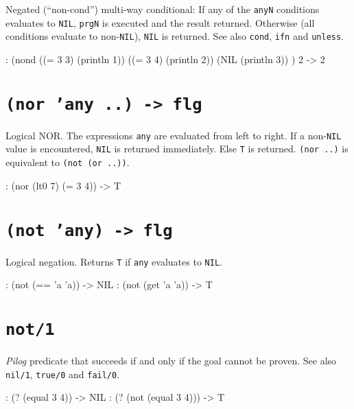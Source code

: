 Negated (``non-cond'') multi-way conditional: If any of the \texttt{anyN}
conditions evaluates to \texttt{NIL}, \texttt{prgN} is executed and the result
returned. Otherwise (all conditions evaluate to non-\texttt{NIL}), \texttt{NIL} is
returned. See also \texttt{cond}, \texttt{ifn} and \texttt{unless}.


\begin{wideverbatim}
: (nond
   ((= 3 3) (println 1))
   ((= 3 4) (println 2))
   (NIL (println 3)) )
2
-> 2
\end{wideverbatim}

 
\section*{\texttt{(nor 'any ..) -> flg}}
\label{sec:func-ref-N-(nor 'any ..) -> flg}


Logical NOR. The expressions \texttt{any} are evaluated from left to right. If
a non-\texttt{NIL} value is encountered, \texttt{NIL} is returned immediately. Else
\texttt{T} is returned. \texttt{(nor ..)} is equivalent to \texttt{(not (or ..))}.


\begin{wideverbatim}
: (nor (lt0 7) (= 3 4))
-> T
\end{wideverbatim}

 
\section*{\texttt{(not 'any) -> flg}}
\label{sec:func-ref-N-(not 'any) -> flg}


Logical negation. Returns \texttt{T} if \texttt{any} evaluates to \texttt{NIL}.


\begin{wideverbatim}
: (not (== 'a 'a))
-> NIL
: (not (get 'a 'a))
-> T
\end{wideverbatim}

 
\section*{\texttt{not/1}}
\label{sec:func-ref-N-not/1}


\emph{Pilog} predicate that succeeds if and only if the
goal cannot be proven. See also \texttt{nil/1}, \texttt{true/0} and \texttt{fail/0}.


\begin{wideverbatim}
: (? (equal 3 4))
-> NIL
: (? (not (equal 3 4)))
-> T
\end{wideverbatim}

